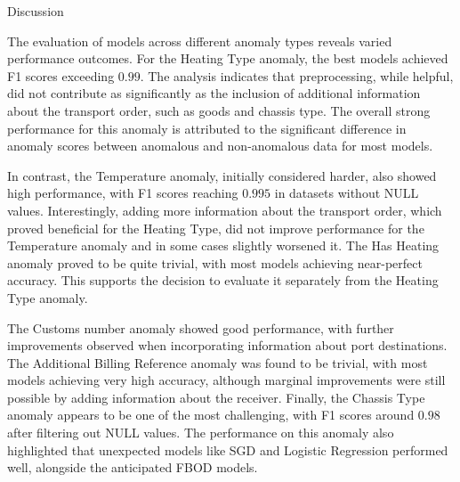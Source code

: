 \sec Discussion

The evaluation of models across different anomaly types reveals varied performance outcomes. For the Heating Type anomaly, the best models achieved F1 scores exceeding $0.99$. The analysis indicates that preprocessing, while helpful, did not contribute as significantly as the inclusion of additional information about the transport order, such as goods and chassis type. The overall strong performance for this anomaly is attributed to the significant difference in anomaly scores between anomalous and non-anomalous data for most models.

In contrast, the Temperature anomaly, initially considered harder, also showed high performance, with F1 scores reaching $0.995$ in datasets without NULL values. Interestingly, adding more information about the transport order, which proved beneficial for the Heating Type, did not improve performance for the Temperature anomaly and in some cases slightly worsened it. The Has Heating anomaly proved to be quite trivial, with most models achieving near-perfect accuracy. This supports the decision to evaluate it separately from the Heating Type anomaly.

The Customs number anomaly showed good performance, with further improvements observed when incorporating information about port destinations. The Additional Billing Reference anomaly was found to be trivial, with most models achieving very high accuracy, although marginal improvements were still possible by adding information about the receiver. Finally, the Chassis Type anomaly appears to be one of the most challenging, with F1 scores around $0.98$ after filtering out NULL values. The performance on this anomaly also highlighted that unexpected models like SGD and Logistic Regression performed well, alongside the anticipated FBOD models.